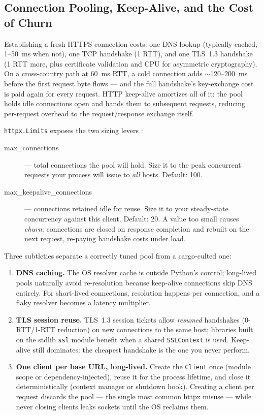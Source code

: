 \subsection{Connection Pooling, Keep-Alive, and the Cost of Churn}
\label{sec:ch02-pooling}

Establishing a fresh HTTPS connection costs: one DNS lookup (typically
cached, 1--50~ms when not), one TCP handshake (1 RTT), and one TLS~1.3
handshake (1 RTT more, plus certificate validation and CPU for asymmetric
cryptography). On a cross-country path at 60~ms RTT, a cold connection adds
$\sim$120--200~ms before the first request byte flows --- and the full
handshake's key-exchange cost is paid again for every request. HTTP keep-alive
amortizes all of it: the pool holds idle connections open and hands them to
subsequent requests, reducing per-request overhead to the request/response
exchange itself.

\texttt{httpx.Limits} exposes the two sizing levers
\cite{httpxdocs}:

\begin{description}
  \item[max\_connections] --- total connections the pool will hold. Size it to
        the peak concurrent requests your process will issue to \emph{all}
        hosts. Default: 100.
  \item[max\_keepalive\_connections] --- connections retained idle for reuse.
        Size it to your steady-state concurrency against this client.
        Default: 20. A value too small causes \emph{churn}: connections are
        closed on response completion and rebuilt on the next request,
        re-paying handshake costs under load.
\end{description}

Three subtleties separate a correctly tuned pool from a cargo-culted one:

\begin{enumerate}
  \item \textbf{DNS caching.} The OS resolver cache is outside Python's
        control; long-lived pools naturally avoid re-resolution because
        keep-alive connections skip DNS entirely. For short-lived
        connections, resolution happens per connection, and a flaky resolver
        becomes a latency multiplier.
  \item \textbf{TLS session reuse.} TLS~1.3 session tickets allow
        \emph{resumed} handshakes (0-RTT/1-RTT reduction) on new connections
        to the same host; libraries built on the stdlib \texttt{ssl} module
        benefit when a shared \texttt{SSLContext} is used. Keep-alive still
        dominates: the cheapest handshake is the one you never perform.
  \item \textbf{One client per base URL, long-lived.} Create the
        \texttt{Client} once (module scope or dependency-injected), reuse it
        for the process lifetime, and close it deterministically (context
        manager or shutdown hook). Creating a client per request discards the
        pool --- the single most common httpx misuse --- while never closing
        clients leaks sockets until the OS reclaims them.
\end{enumerate}

